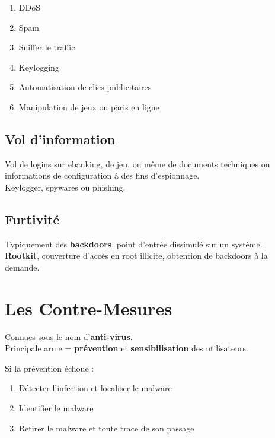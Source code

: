 \documentclass{report}
\begin{document}
			\begin{enumerate}
				\item DDoS
				\item Spam
				\item Sniffer le traffic
				\item Keylogging
				\item Automatisation de clics publicitaires
				\item Manipulation de jeux ou paris en ligne\\
			\end{enumerate}

		\subsection{Vol d'information}

			Vol de logins sur ebanking, de jeu, ou même de documents techniques ou informations de configuration à des fins d'espionnage.\\

			Keylogger, spywares ou phishing.\\

		\subsection{Furtivité}

			Typiquement des \textbf{backdoors}, point d'entrée dissimulé sur un système.\\

			\textbf{Rootkit}, couverture d'accès en root illicite, obtention de backdoors à la demande.\\

	\section{Les Contre-Mesures}

		Connues sous le nom d'\textbf{anti-virus}.\\
		Principale arme = \textbf{prévention} et \textbf{sensibilisation} des utilisateurs.

		Si la prévention échoue : \\

		\begin{enumerate}
			\item Détecter l'infection et localiser le malware
			\item Identifier le malware
			\item Retirer le malware et toute trace de son passage\\
		\end{enumerate}
	
\end{document}
